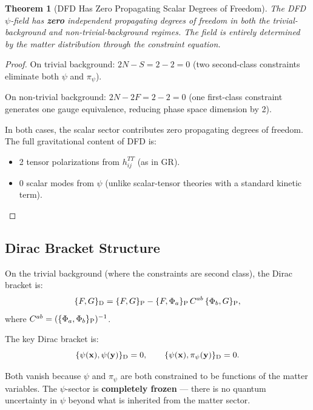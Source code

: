 \documentclass[11pt,a4paper]{article}
\newtheorem{theorem}{Theorem}
\begin{document}
\begin{theorem}[DFD Has Zero Propagating Scalar Degrees of Freedom]
\label{thm:zero-dof}
The DFD $\psi$-field has \textbf{zero} independent propagating degrees of freedom in both the trivial-background and non-trivial-background regimes. The field is entirely determined by the matter distribution through the constraint equation.
\end{theorem}

\begin{proof}
On trivial background: $2N - S = 2 - 2 = 0$ (two second-class constraints eliminate both $\psi$ and $\pi_\psi$).

On non-trivial background: $2N - 2F = 2 - 2 = 0$ (one first-class constraint generates one gauge equivalence, reducing phase space dimension by 2).

In both cases, the scalar sector contributes zero propagating degrees of freedom. The full gravitational content of DFD is:
\begin{itemize}
\item 2 tensor polarizations from $h_{ij}^{TT}$ (as in GR).
\item 0 scalar modes from $\psi$ (unlike scalar-tensor theories with a standard kinetic term).
\end{itemize}
\end{proof}

\subsection{Dirac Bracket Structure}

On the trivial background (where the constraints are second class), the Dirac bracket is:
\begin{equation}
\{F, G\}_{\rm D} = \{F, G\}_{\rm P} - \{F, \Phi_a\}_{\rm P}\,C^{ab}\,\{\Phi_b, G\}_{\rm P},
\end{equation}
where $C^{ab} = (\{\Phi_a, \Phi_b\}_{\rm P})^{-1}$.

The key Dirac bracket is:
\begin{equation}
\{\psi(\mathbf{x}), \psi(\mathbf{y})\}_{\rm D} = 0, \qquad
\{\psi(\mathbf{x}), \pi_\psi(\mathbf{y})\}_{\rm D} = 0.
\end{equation}

Both vanish because $\psi$ and $\pi_\psi$ are both constrained to be functions of the matter variables. The $\psi$-sector is \textbf{completely frozen} --- there is no quantum uncertainty in $\psi$ beyond what is inherited from the matter sector.
\end{document}
